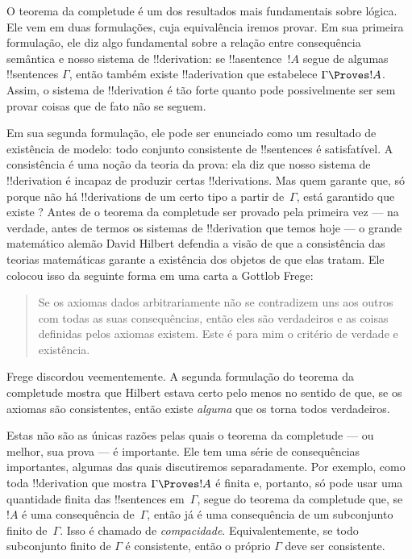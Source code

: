 \documentclass[../../../include/open-logic-section]{subfiles}
\begin{document}
      {}
      {}


O teorema da completude é um dos resultados mais fundamentais sobre
lógica.  Ele vem em duas formulações, cuja equivalência iremos
provar.  Em sua primeira formulação, ele diz algo fundamental sobre
a relação entre consequência semântica e nosso sistema de
!!{derivation}: se !!a{sentence}~$!A$ segue de algumas !!{sentence}s
$\Gamma$, então também existe !!a{derivation} que estabelece $\Gamma
\Proves !A$. Assim, o sistema de !!{derivation} é tão forte quanto pode
possivelmente ser sem provar coisas que de fato não se seguem.

Em sua segunda formulação, ele pode ser enunciado como um resultado de
existência de modelo: todo conjunto consistente de !!{sentence}s é
satisfatível.  A consistência é uma noção da teoria da prova: ela diz
que nosso sistema de !!{derivation} é incapaz de produzir certas
!!{derivation}s.  Mas quem garante que, só porque não há !!{derivation}s
de um certo tipo a partir de~$\Gamma$, está garantido que existe
? Antes de
o teorema da completude ser provado pela primeira vez --- na verdade,
antes de termos os sistemas de !!{derivation} que temos hoje --- o grande
matemático alemão David Hilbert defendia a visão de que a consistência
das teorias matemáticas garante a existência dos objetos de que elas
tratam. Ele colocou isso da seguinte forma em uma carta a Gottlob
Frege:
\begin{quote}
  Se os axiomas dados arbitrariamente não se contradizem uns aos
  outros com todas as suas consequências, então eles são verdadeiros e
  as coisas definidas pelos axiomas existem. Este é para mim o critério
  de verdade e existência. 
\end{quote}
Frege discordou veementemente. A segunda formulação do teorema da
completude mostra que Hilbert estava certo pelo menos no sentido de que,
se os axiomas são consistentes, então existe \emph{alguma}
 que os torna todos
verdadeiros.

Estas não são as únicas razões pelas quais o teorema da completude ---
ou melhor, sua prova --- é importante.  Ele tem uma série de
consequências importantes, algumas das quais discutiremos
separadamente.  Por exemplo, como toda !!{derivation} que mostra
$\Gamma \Proves !A$ é finita e, portanto, só pode usar uma quantidade
finita das !!{sentence}s em~$\Gamma$, segue do teorema da completude
que, se $!A$ é uma consequência de~$\Gamma$, então já é uma
consequência de um subconjunto finito de~$\Gamma$.  Isso é chamado de
\emph{compacidade}.  Equivalentemente, se todo subconjunto finito de
$\Gamma$ é consistente, então o próprio $\Gamma$ deve ser consistente.
\end{document}
